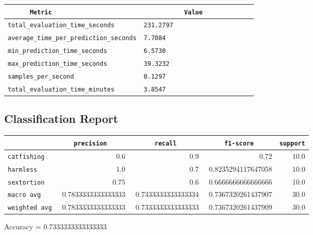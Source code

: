 \documentclass{article}
\begin{document}
\begin{center}
\begin{tabular}{l | l} \hline
    \verb|      Metric     | & \verb|           Value           | \\ \hline
    \hline
    \verb|total_evaluation_time_seconds| & \verb|231.2797                     | \\ \hline
    \verb|average_time_per_prediction_seconds| & \verb|7.7084                       | \\ \hline
    \verb|min_prediction_time_seconds| & \verb|6.5730                       | \\ \hline
    \verb|max_prediction_time_seconds| & \verb|39.3232                      | \\ \hline
    \verb|samples_per_second| & \verb|0.1297                       | \\ \hline
    \verb|total_evaluation_time_minutes| & \verb|3.8547                       | \\ \hline
\end{tabular}
\end{center}

\subsection{Classification Report}

\begin{center}
\begin{tabular}{l | r | r | r | r} \hline
    \verb|            | & \verb|    precision     | & \verb|      recall      | & \verb|     f1-score     | & \verb|support| \\ \hline
    \hline
    \verb|catfishing | & 0.6 & 0.9 & 0.72 &    10.0 \\ \hline
    \verb|harmless   | & 1.0 & 0.7 & 0.8235294117647058 &    10.0 \\ \hline
    \verb|sextortion | & 0.75 & 0.6 & 0.6666666666666666 &    10.0 \\ \hline
    \verb|macro avg  | & 0.7833333333333333 & 0.7333333333333334 & 0.7367320261437907 &    30.0 \\ \hline
    \verb|weighted avg| & 0.7833333333333333 & 0.7333333333333333 & 0.7367320261437909 &    30.0 \\ \hline
\end{tabular}
\end{center}

\begin{center}
Accuracy = 0.7333333333333333
\end{center}
\end{document}
